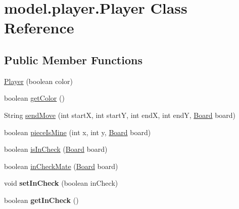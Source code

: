 \hypertarget{classmodel_1_1player_1_1_player}{\section{model.\-player.\-Player Class Reference}
\label{classmodel_1_1player_1_1_player}
}
\subsection*{Public Member Functions}
\begin{DoxyCompactItemize}
\item 
\hyperlink{classmodel_1_1player_1_1_player_a5561bd22416d82d6e42eddaa70d994e7}{Player} (boolean color)
\item 
boolean \hyperlink{classmodel_1_1player_1_1_player_a94b99ab0e9b9c30effe09eb3c138630b}{get\-Color} ()
\item 
String \hyperlink{classmodel_1_1player_1_1_player_a4a9708059cfd3e137afd96612a14e2e0}{send\-Move} (int start\-X, int start\-Y, int end\-X, int end\-Y, \hyperlink{classmodel_1_1board_1_1_board}{Board} board)
\item 
boolean \hyperlink{classmodel_1_1player_1_1_player_a450d4ad35eb99076e4a749a1a2cc840a}{piece\-Is\-Mine} (int x, int y, \hyperlink{classmodel_1_1board_1_1_board}{Board} board)
\item 
boolean \hyperlink{classmodel_1_1player_1_1_player_a043bd3918e2c70d803d9a282dc437146}{is\-In\-Check} (\hyperlink{classmodel_1_1board_1_1_board}{Board} board)
\item 
boolean \hyperlink{classmodel_1_1player_1_1_player_af7234474a49fa36db7baff7123f84c90}{in\-Check\-Mate} (\hyperlink{classmodel_1_1board_1_1_board}{Board} board)
\item 
\hypertarget{classmodel_1_1player_1_1_player_a62815a859fb1e3299223c799e655070a}{void {\bfseries set\-In\-Check} (boolean in\-Check)}\label{classmodel_1_1player_1_1_player_a62815a859fb1e3299223c799e655070a}

\item 
\hypertarget{classmodel_1_1player_1_1_player_aa6da181047898b4b81771cab63672633}{boolean {\bfseries get\-In\-Check} ()}\label{classmodel_1_1player_1_1_player_aa6da181047898b4b81771cab63672633}

\end{DoxyCompactItemize}
